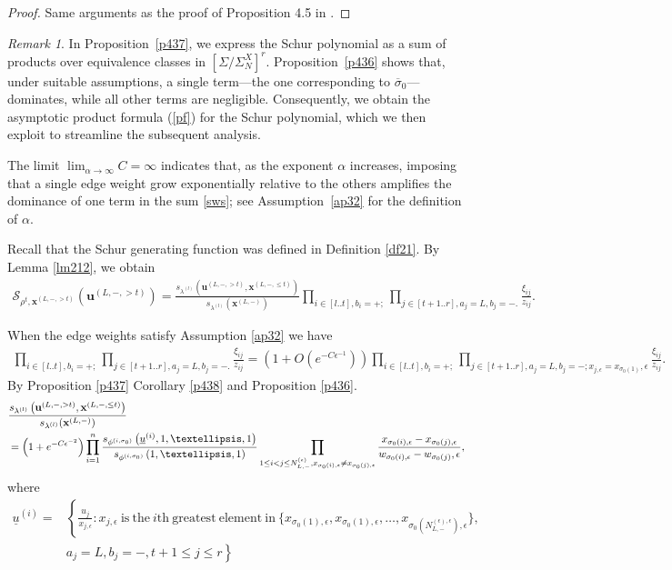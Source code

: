 \documentclass[11pt]{amsart}
\theoremstyle{plain}
\theoremstyle{definition}
\theoremstyle{remark}
\newtheorem{remark}[theorem]{Remark}
\newcommand\si{\sigma}
\numberwithin{equation}{section}
\numberwithin{theorem}{section}
\numberwithin{figure}{section}
\begin{document}
\begin{proof}Same arguments as the proof of Proposition 4.5 in \cite{ZL18}.
\end{proof}

\begin{remark}In Proposition~\ref{p437}, we express the Schur polynomial as a sum of products over equivalence classes in $[\Sigma/\Sigma_N^X]^r$. Proposition~\ref{p436} shows that, under suitable assumptions, a single term—the one corresponding to $\overline{\sigma}_0$—dominates, while all other terms are negligible. Consequently, we obtain the asymptotic product formula (\ref{pf}) for the Schur polynomial, which we then exploit to streamline the subsequent analysis.

The limit $\lim_{\alpha\to\infty} C=\infty$ indicates that, as the exponent $\alpha$ increases, imposing that a single edge weight grow exponentially relative to the others amplifies the dominance of one term in the sum \eqref{sws}; see Assumption~\ref{ap32} for the definition of $\alpha$.
\end{remark}

Recall that the Schur generating function was defined in Definition \ref{df21}. By Lemma \ref{lm212}, we obtain
\begin{align}\label{sbf}
\mathcal{S}_{\rho^t,\mathbf{x}^{(L,-,> t)}}(\mathbf{u}^{(L,-,> t)})=
\frac{s_{\lambda^{(l)}}\left(\mathbf{u}^{(L,-,> t)},\mathbf{x}^{(L,-,\leq t)}\right)}{s_{\lambda^{(l)}}(\mathbf{x}^{(L,-)})}
\prod_{i\in[l..t],b_i=+;}
\prod_{j\in[t+1..r],a_j=L,b_j=-.}\frac{\xi_{ij}}{z_{ij}}.
\end{align}

When the edge weights satisfy Assumption \ref{ap32} we have
\begin{align*}
\prod_{i\in[l..t],b_i=+;}
\prod_{j\in[t+1..r],a_j=L,b_j=-.}\frac{\xi_{ij}}{z_{ij}}=\left(1+O(e^{-C\epsilon^{-1}})\right)\prod_{i\in[l..t],b_i=+;}\prod_{j\in[t+1..r],a_j=L,b_j=-;x_{j,\epsilon}=x_{\si_0(1)},\epsilon}\frac{\xi_{ij}}{z_{ij}}.
\end{align*}
By Proposition \ref{p437} Corollary \ref{p438} and Proposition \ref{p436}.
\begin{align}
&\frac{s_{\lambda^{(l)}}\left(\mathbf{u}^{(L,-,> t)},\mathbf{x}^{(L,-,\leq t)}\right)}{s_{\lambda^{(l)}}(\mathbf{x}^{(L,-)})}\label{pf}\\
&=\left(1+e^{-C\epsilon^{-2}}\right)\prod_{i=1}^{n}
\frac{s_{\phi^{(i,\sigma_0)}}\left(\underline{u}^{(i)},1,\ldots,1\right)}{s_{\phi^{(i,\sigma_0)}}\left(1,\ldots,1\right)}\prod_{1\leq i<j\leq N_{L,-}^{(\epsilon)},x_{\si_0(i),\epsilon}\neq x_{\si_0(j),\epsilon}}\frac{x_{\si_0(i),\epsilon}-x_{\si_0(j),\epsilon}}{w_{\si_0(i),\epsilon}-w_{\si_0(j)},\epsilon}\notag,
\end{align}
where
\begin{align*}
\underline{u}^{(i)}=&\left\{\frac{u_j}{x_{j,\epsilon}}:x_{j,\epsilon}\ \mathrm{is\ the\ }i\mathrm{th\ greatest\ element\ in\ } \{x_{\si_0(1),\epsilon},x_{\si_0(1),\epsilon},\ldots,x_{\si_0(N_{L,-}^{(\epsilon),\epsilon}),\epsilon}\},\right.\\
&\left.a_j=L,b_j=-,t+1\leq j\leq r\right\}
\end{align*}
\end{document}
